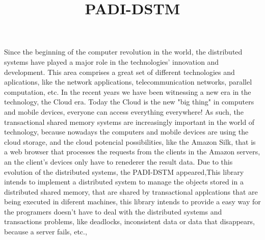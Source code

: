 \documentclass[times, 10pt,twocolumn]{article}
\begin{document}
\title{PADI-DSTM}



\maketitle
\thispagestyle{empty}


Since the beginning of the computer revolution in the world, the distributed systems have played a major role in the technologies' innovation and development. This area comprises a great set of different technologies and aplications, like the network applications, telecommunication networks, parallel computation, etc. In the recent years we have been witnessing a new era in the technology, the Cloud era. Today the Cloud is the new "big thing" in computers and mobile devices, everyone can access everything  everywhere! As such, the transactional shared memory systems are increasingly important in the world of technology, because nowadays the computers and mobile devices are using the cloud storage, and the cloud potencial possibilities, like the Amazon Silk, that is a web browser that processes the requests from the clients in the Amazon servers, an the client's devices only have to renederer the result data. Due to this evolution of the distributed systems, the PADI-DSTM appeared,This library intends to implement a distributed system to manage the objects stored in a distributed shared memory, that are shared by transactional applcations that are being executed in diferent machines, this library intends to provide a easy way for the programers doesn't have to deal with the distributed systems and transactions problems, like deadlocks, inconsistent data or data that disappears, because a server fails, etc.,

\end{document}
